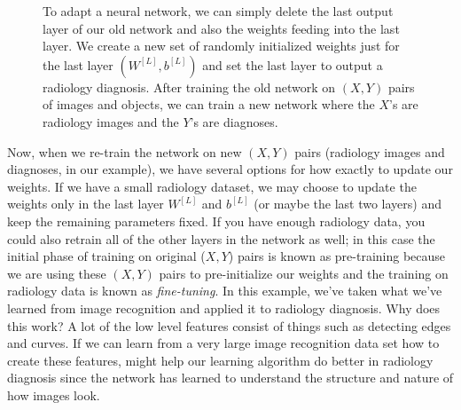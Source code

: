 \documentclass[12pt]{article}
\begin{document}
\begin{figure}[h]
\caption{\footnotesize To adapt a neural network, we can simply delete the last output layer of our old network and also the weights feeding into the last layer. We create a new set of randomly initialized weights just for the last layer $(W^{[L]}, b^{[L]})$ and set the last layer to output
a radiology diagnosis. After training the old network on $(X,Y)$ pairs of images and objects, we can train a new network where the $X$'s are radiology images and the $Y$'s are diagnoses.}
\end{figure}

Now, when we re-train the network on new $(X,Y)$ pairs (radiology images and diagnoses, in our example), we have several options for how exactly to update our weights. If we have a small radiology dataset, we may choose to update the weights only in the last layer
$W^{[L]}$ and $b^{[L]}$ (or maybe the last two layers) and keep the remaining parameters fixed. If you have enough radiology data, you could also retrain all of the other layers in the network as well; in this case the initial phase of training on original ($X,Y$) pairs is known as pre-training
because we are using these $(X,Y)$ pairs to pre-initialize our weights and the training on radiology data is known as \emph{fine-tuning}. In this example, we've taken what we've learned from image recognition and applied it to radiology diagnosis. Why does this work? A lot of the low level features consist of things such as detecting edges and curves. If we can learn from a very large image recognition data set how to create these features, might help our learning algorithm do better in radiology diagnosis since the network has learned to understand the structure and nature of how images look.
\end{document}
